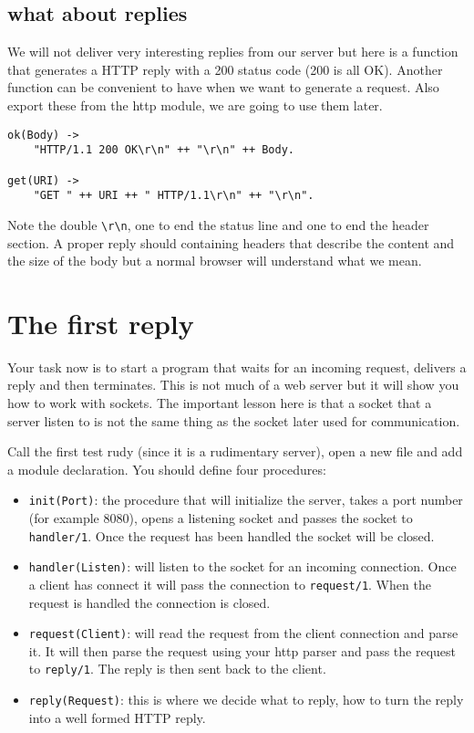 \documentclass[a4paper,11pt]{article}
\begin{document}
\subsection{what about replies}

We will not deliver very interesting replies from our server but here
is a function that generates a HTTP reply with a 200 status code (200
is all OK). Another function can be convenient to have when we want to
generate a request. Also export these from the http module, we are
going to use them later.

\begin{verbatim}
ok(Body) ->
    "HTTP/1.1 200 OK\r\n" ++ "\r\n" ++ Body.

get(URI) ->
    "GET " ++ URI ++ " HTTP/1.1\r\n" ++ "\r\n".
\end{verbatim}

Note the double {\tt \textbackslash r\textbackslash n}, one to end the
status line and one to end the header section. A proper reply should
containing headers that describe the content and the size of the body
but a normal browser will understand what we mean.

\section{The first reply}

Your task now is to start a program that waits for an incoming
request, delivers a reply and then terminates. This is not much of a
web server but it will show you how to work with sockets. The
important lesson here is that a socket that a server listen to is not
the same thing as the socket later used for communication. 

Call the first test rudy (since it is a rudimentary server), open a
new file and add a module declaration. You should define four
procedures:

\begin{itemize}
\item {\tt init(Port)}: the procedure that will initialize the server, takes a
port number (for example 8080), opens a listening socket and passes the
socket to {\tt handler/1}. Once the request has been handled the socket
will be closed.

\item {\tt handler(Listen)}: will listen to the socket for an incoming
connection. Once a client has connect it will pass the connection to
{\tt request/1}. When the request is handled the connection is closed.

\item {\tt request(Client)}: will read the request from the client
connection and parse it. It will then parse the request using your
http parser and pass the request to {\tt reply/1}. The reply is then
sent back to the client.

\item {\tt reply(Request)}: this is where we decide what to
reply, how to turn the reply into a well formed HTTP reply.
\end{itemize}
\end{document}
